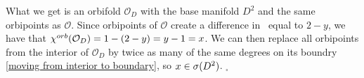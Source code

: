 What we get is an orbifold $\mathcal{O}_D$ with the base 
manifold $D^2$ and the same 
orbipoints as $\mathcal{O}$. Since orbipoints of $\mathcal{O}$ create a difference 
in \Eoc\ equal to $2-y$, we have that ${\chi^{orb}(\mathcal{O}_D)} = 1 - (2-y) = y - 1 = x$. 
We can then replace all orbipoints from the interior of $\mathcal{O}_D$ by twice as many 
of the same degrees on its boundry \ref{moving from interior to boundary}, 
so $x \in {{\sigma}(D^2)}$. $_\square$\\









